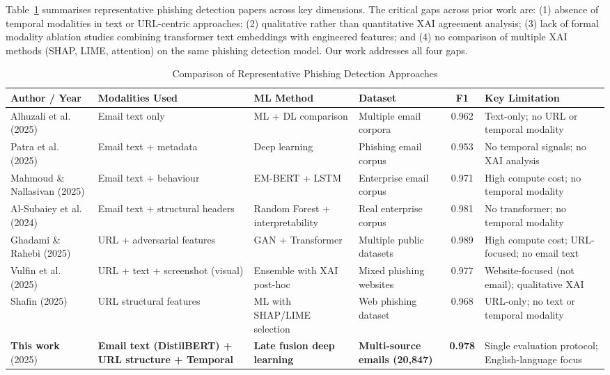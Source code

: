 \documentclass[conference]{IEEEtran}
\begin{document}
Table~\ref{tab:related_work} summarises representative phishing
detection papers across key dimensions. The critical gaps across prior work
are: (1) absence of temporal modalities in text or URL-centric approaches;
(2) qualitative rather than quantitative XAI agreement analysis; (3) lack of
formal modality ablation studies combining transformer text embeddings with
engineered features; and (4) no comparison of multiple XAI methods
(SHAP, LIME, attention) on the same phishing detection model. Our work
addresses all four gaps.

\begin{table}[t]
\centering
\caption{Comparison of Representative Phishing Detection Approaches}
\label{tab:related_work}
\renewcommand{\arraystretch}{1.15}
\begin{tabular}{p{2.9cm} p{3.2cm} p{2.6cm} p{2.4cm} c p{2.8cm}}
\toprule
\textbf{Author / Year} & \textbf{Modalities Used} & \textbf{ML Method} & \textbf{Dataset} & \textbf{F1} & \textbf{Key Limitation} \\
\midrule
Alhuzali et al.\ \cite{alhuzali2025} (2025)
  & Email text only
  & ML + DL comparison
  & Multiple email corpora
  & 0.962
  & Text-only; no URL or temporal modality \\
\addlinespace
Patra et al.\ \cite{patra2025} (2025)
  & Email text + metadata
  & Deep learning
  & Phishing email corpus
  & 0.953
  & No temporal signals; no XAI analysis \\
\addlinespace
Mahmoud \& Nallasivan \cite{mahmoud2025} (2025)
  & Email text + behaviour
  & EM-BERT + LSTM
  & Enterprise email corpus
  & 0.971
  & High compute cost; no temporal modality \\
\addlinespace
Al-Subaiey et al.\ \cite{alsubaiey2024} (2024)
  & Email text + structural headers
  & Random Forest + interpretability
  & Real enterprise corpus
  & 0.981
  & No transformer; no temporal modality \\
\addlinespace
Ghadami \& Rahebi \cite{ghadami2025} (2025)
  & URL + adversarial features
  & GAN + Transformer
  & Multiple public datasets
  & 0.989
  & High compute cost; URL-focused; no email text \\
\addlinespace
Vulfin et al.\ \cite{vulfin2025} (2025)
  & URL + text + screenshot (visual)
  & Ensemble with XAI post-hoc
  & Mixed phishing websites
  & 0.977
  & Website-focused (not email); qualitative XAI \\
\addlinespace
Shafin \cite{shafin2025} (2025)
  & URL structural features
  & ML with SHAP/LIME selection
  & Web phishing dataset
  & 0.968
  & URL-only; no text or temporal modality \\
\addlinespace
\textbf{This work} (2025)
  & \textbf{Email text (DistilBERT) + URL structure + Temporal}
  & \textbf{Late fusion deep learning}
  & \textbf{Multi-source emails (20,847)}
  & \textbf{0.978}
  & Single evaluation protocol; English-language focus \\
\bottomrule
\end{tabular}
\end{table}
\end{document}
